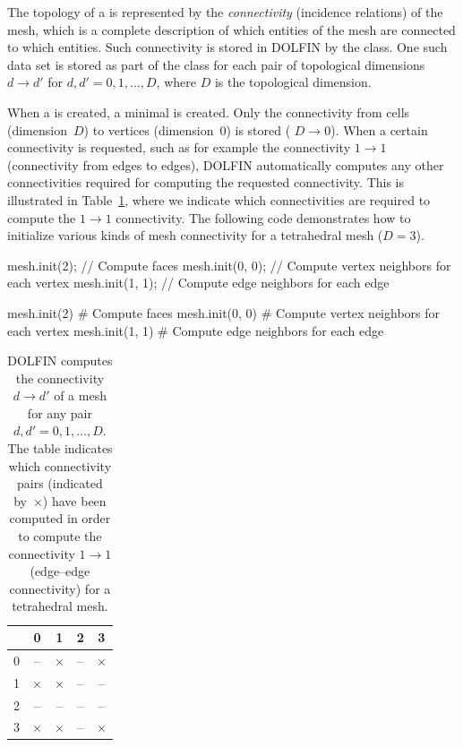 The topology of a  is represented by the \emph{connectivity}
(incidence relations) of the mesh, which is a complete description of
which entities of the mesh are connected to which entities. Such
connectivity is stored in DOLFIN by the 
class. One such data set is stored as part of the class
 for each pair of topological dimensions $d
\rightarrow d'$ for $d, d' = 0, 1, \ldots, D$, where $D$ is the
topological dimension.

When a  is created, a minimal  is created.
Only the connectivity from cells (dimension~$D$) to vertices
(dimension~$0$) is stored ( $D \rightarrow 0$).
When a certain connectivity is requested, such as for example the connectivity
$1 \rightarrow 1$ (connectivity from edges to edges), DOLFIN automatically
computes any other connectivities required for computing the requested
connectivity. This is illustrated in Table~\ref{tab:logg-2:connectivity},
where we indicate which connectivities are required to compute the $1
\rightarrow 1$ connectivity.  The following code demonstrates how to
initialize various kinds of mesh connectivity for a tetrahedral mesh
($D = 3$).
\begin{c++}
mesh.init(2);    // Compute faces
mesh.init(0, 0); // Compute vertex neighbors for each vertex
mesh.init(1, 1); // Compute edge neighbors for each edge
\end{c++}
\begin{python}
mesh.init(2)      # Compute faces
mesh.init(0, 0)   # Compute vertex neighbors for each vertex
mesh.init(1, 1)   # Compute edge neighbors for each edge
\end{python}

\begin{table}
  \centering
  \begin{tabular}{c|cccc}
    & 0 & 1 & 2 & 3 \\
    \midrule
    0 & -- & $\times$ & -- & $\times$ \\
    1 & $\times$ & $\times$ & -- & -- \\
    2 & -- & -- & -- & -- \\
    3 & $\times$ & $\times$ & -- & $\times$ \\
  \end{tabular}
  \caption{DOLFIN computes the connectivity $d \rightarrow d'$ of a
    mesh for any pair $d, d' = 0, 1, \ldots, D$. The table
    indicates which connectivity pairs (indicated by~$\times$) have
    been computed in order to compute the connectivity $1 \rightarrow
    1$ (edge--edge connectivity) for a tetrahedral mesh.}
  \label{tab:logg-2:connectivity}
\end{table}

